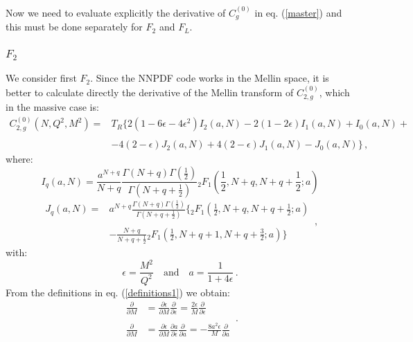 \documentclass[10pt,a4paper]{article}
\begin{document}
Now we need to evaluate explicitly the derivative of $C_g^{(0)}$ in eq. (\ref{master}) and this must be done separately for $F_2$ and $F_L$. 

\subsubsection{$F_2$}

We consider first $F_2$. Since the NNPDF code works in the Mellin space, it is better to calculate directly the derivative of the Mellin transform of $C_{2,g}^{(0)}$, which in the massive case is:
\begin{equation}
\begin{array}{rl}
\displaystyle C_{2,g}^{(0)}(N,Q^2,M^2)=&\displaystyle T_R\Big\{2(1-6\epsilon-4\epsilon^2)I_2(a,N)-2(1-2\epsilon)I_1(a,N)+I_0(a,N)+\\
\\
& \displaystyle -4(2-\epsilon)J_2(a,N)+4(2-\epsilon)J_1(a,N)-J_0(a,N)\Big\}\,,
\end{array}
\end{equation}
where:
\begin{equation}
I_q(a,N) =
\frac{a^{N+q}}{N+q}\frac{\Gamma(N+q)\Gamma(\frac12)}{\Gamma(N+q+\frac12)}
{_2F_1}\left(\frac12,N+q,N+q+\frac12;a\right)
\label{iq}
\end{equation}
\begin{equation}
\begin{array}{rl}
J_q(a,N) =&\displaystyle a^{N+q}\frac{\Gamma(N+q)\Gamma(\frac12)}{\Gamma(N+q+\frac12)}\bigg\{{_2F_1}\left(\frac12,N+q,N+q+\frac12;a\right)\\
\\
&\displaystyle -\frac{N+q}{N+q+\frac12}{_2F_1}\left(\frac12,N+q+1,N+q+\frac32;a\right)\bigg\}
\end{array}\,,
\label{jq}
\end{equation}
with:
\begin{equation}
\epsilon = \frac{M^2}{Q^2}\quad\mbox{and}\quad
a=\frac1{1+4\epsilon}\,.
\label{definitions1}
\end{equation}
From the definitions in eq. (\ref{definitions1}) we obtain:
\begin{equation}
\begin{array}{rl}
\displaystyle \frac{\partial}{\partial M} &\displaystyle = \frac{\partial \epsilon}{\partial M} \frac{\partial}{\partial \epsilon} = \frac{2\epsilon}{M}\frac{\partial}{\partial \epsilon}\\
\\
\displaystyle \frac{\partial}{\partial M} &\displaystyle = \frac{\partial \epsilon}{\partial M} \frac{\partial a}{\partial \epsilon} \frac{\partial}{\partial a} = -\frac{8a^2\epsilon}{M}\frac{\partial}{\partial a}
\end{array}\,.
\label{gngngngngng}
\end{equation}
\end{document}
